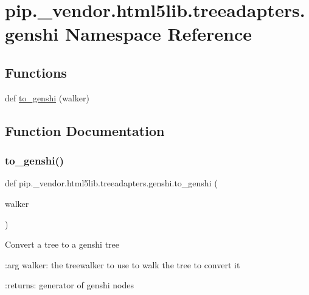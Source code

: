 \hypertarget{namespacepip_1_1__vendor_1_1html5lib_1_1treeadapters_1_1genshi}{}\section{pip.\+\_\+vendor.\+html5lib.\+treeadapters.\+genshi Namespace Reference}
\label{namespacepip_1_1__vendor_1_1html5lib_1_1treeadapters_1_1genshi}
\subsection*{Functions}
\begin{DoxyCompactItemize}
\item 
def \hyperlink{namespacepip_1_1__vendor_1_1html5lib_1_1treeadapters_1_1genshi_a1c36c3f700fc045d036fcf90bbbf25a0}{to\+\_\+genshi} (walker)
\end{DoxyCompactItemize}


\subsection{Function Documentation}
\mbox{\label{namespacepip_1_1__vendor_1_1html5lib_1_1treeadapters_1_1genshi_a1c36c3f700fc045d036fcf90bbbf25a0}} 
\subsubsection{\texorpdfstring{to\+\_\+genshi()}{to\_genshi()}}
{\footnotesize\ttfamily def pip.\+\_\+vendor.\+html5lib.\+treeadapters.\+genshi.\+to\+\_\+genshi (\begin{DoxyParamCaption}\item[{}]{walker }\end{DoxyParamCaption})}

\begin{DoxyVerb}Convert a tree to a genshi tree

:arg walker: the treewalker to use to walk the tree to convert it

:returns: generator of genshi nodes\end{DoxyVerb}
 